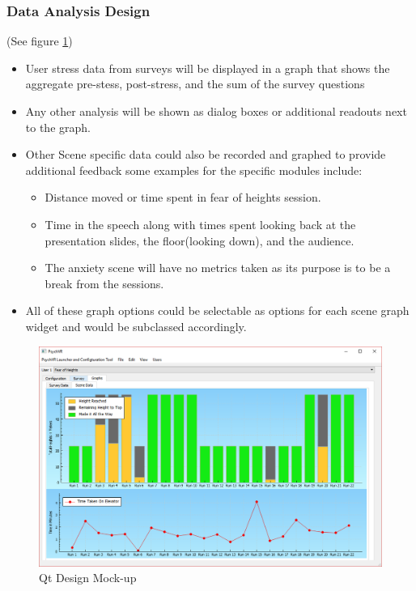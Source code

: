 \documentclass[a4paper,10pt]{article}
\begin{document}
\subsubsection{Data Analysis Design}
(See figure \ref{fig:qtMockupData})
  \begin{itemize}
  \item User stress data from surveys will be displayed in a graph that shows the aggregate pre-stess, post-stress, and the sum of the survey questions
  \item Any other analysis will be shown as dialog boxes or additional readouts next to the graph.
  \item Other Scene specific data could also be recorded and graphed to provide additional feedback some examples for the specific modules include:
	\begin{itemize}
	\item Distance moved or time spent in fear of heights session.
	\item Time in the speech along with times spent looking back at the presentation slides, the floor(looking down), and the audience. 
	\item The anxiety scene will have no metrics taken as its purpose is to be a break from the sessions.
	\end{itemize}
\item All of these graph options could be selectable as options for each scene graph widget and would be subclassed accordingly.
  \end{itemize}
\begin{figure}[H]
				    \centerline{\includegraphics[scale = 0.5]{qtHeightGraph.png}}
					\caption{Qt Design Mock-up}
					\label{fig:qtMockupData}
				\end{figure}
\end{document}
